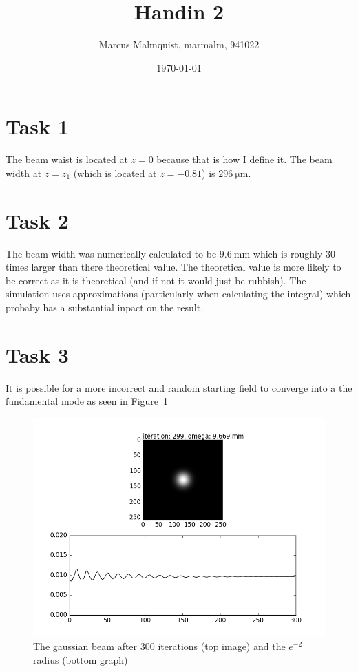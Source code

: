 \documentclass[12pt,a4paper]{article}
\title{Handin 2}
\author{Marcus Malmquist, marmalm, 941022}
\date{\today}
\begin{document}
\maketitle

\section{Task 1}\label{sec:1}
The beam waist is located at $z=0$ because that is how I define it. The beam width at $z=z_1$ (which is located at $z=-0.81$) is $\SI{296}{\micro\metre}$.

\section{Task 2}\label{sec:2}
The beam width was numerically calculated to be $\SI{9.6}{\milli\metre}$ which is roughly 30 times larger than there theoretical value. The theoretical value is more likely to be correct as it is theoretical (and if not it would just be rubbish). The simulation uses approximations (particularly when calculating the integral) which probaby has a substantial inpact on the result.

\section{Task 3}\label{sec:3}
It is possible for a more incorrect and random starting field to converge into a the fundamental mode as seen in Figure~\ref{fig:task3}
\begin{figure}
  \centering
  \includegraphics[width=\textwidth]{3_gauss_0_0.png}
  \caption{The gaussian beam after 300 iterations (top image) and the $e^{-2}$ radius (bottom graph)}
  \label{fig:task3}
\end{figure}
\end{document}
